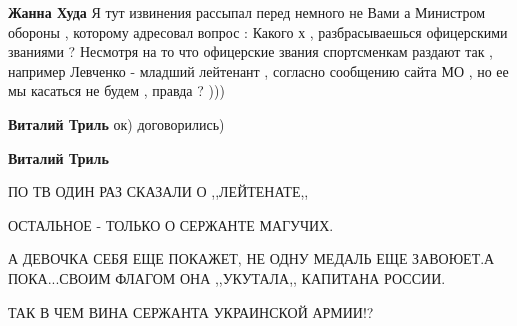 \begin{itemize}
\begin{itemize}
 
\textbf{Жанна Худа} Я тут извинения рассыпал перед немного не Вами а Министром
обороны , которому адресовал вопрос : Какого х , разбрасываешься офицерскими
званиями ? Несмотря на то что офицерские звания спортсменкам раздают так ,
например Левченко - младший лейтенант , согласно сообщению сайта МО , но ее мы
касаться не будем , правда ? )))

 
\textbf{Виталий Триль} ок) договорились)

 
\textbf{Виталий Триль} 

ПО ТВ ОДИН РАЗ СКАЗАЛИ О ,,ЛЕЙТЕНАТЕ,,

ОСТАЛЬНОЕ - ТОЛЬКО О СЕРЖАНТЕ МАГУЧИХ.

А ДЕВОЧКА СЕБЯ ЕЩЕ ПОКАЖЕТ, НЕ ОДНУ МЕДАЛЬ ЕЩЕ ЗАВОЮЕТ.А ПОКА...СВОИМ ФЛАГОМ
ОНА ,,УКУТАЛА,, КАПИТАНА РОССИИ.

ТАК В ЧЕМ ВИНА СЕРЖАНТА УКРАИНСКОЙ АРМИИ!?

\end{itemize}

\end{itemize}

